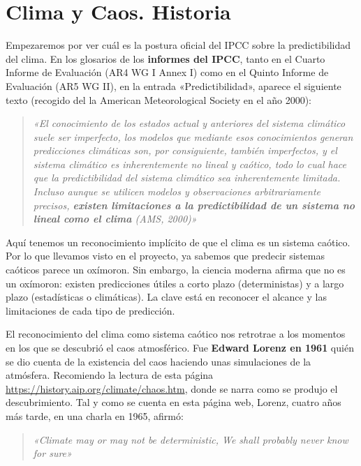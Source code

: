 \documentclass[
  10pt,
  a4paper,
  DIV=11,
  numbers=noendperiod,
  open=any]{scrreprt}
\numberwithin{equation}{chapter}
\numberwithin{equation}{section}
\renewcommand{\[}{\begin{equation}}
\renewcommand{\]}{\end{equation}}
\begin{document}
\section{Clima y Caos. Historia}\label{clima-y-caos.-historia}

Empezaremos por ver cuál es la postura oficial del IPCC sobre la
predictibilidad del clima. En los glosarios de los \textbf{informes del
IPCC}, tanto en el Cuarto Informe de Evaluación (AR4 WG I Annex I) como
en el Quinto Informe de Evaluación (AR5 WG II), en la entrada
«Predictibilidad», aparece el siguiente texto (recogido del la American
Meteorological Society en el año 2000):

\begin{quote}
\itshape
«El conocimiento de los estados actual y anteriores del sistema
climático suele ser imperfecto, los modelos que mediante esos
conocimientos generan predicciones climáticas son, por consiguiente,
también imperfectos, y el sistema climático es inherentemente no lineal
y caótico, todo lo cual hace que la predictibilidad del sistema
climático sea inherentemente limitada. Incluso aunque se utilicen
modelos y observaciones arbitrariamente precisos, \textbf{existen
limitaciones a la predictibilidad de un sistema no lineal como el clima}
(AMS, 2000)»
\end{quote}

Aquí tenemos un reconocimiento implícito de que el clima es un sistema
caótico. Por lo que llevamos visto en el proyecto, ya sabemos que
predecir sistemas caóticos parece un oxímoron. Sin embargo, la ciencia
moderna afirma que no es un oxímoron: existen predicciones útiles a
corto plazo (deterministas) y a largo plazo (estadísticas o climáticas).
La clave está en reconocer el alcance y las limitaciones de cada tipo de
predicción.

El reconocimiento del clima como sistema caótico nos retrotrae a los
momentos en los que se descubrió el caos atmosférico. Fue \textbf{Edward
Lorenz en 1961} quién se dio cuenta de la existencia del caos haciendo
unas simulaciones de la atmósfera. Recomiendo la lectura de esta página
\url{https://history.aip.org/climate/chaos.htm}, donde se narra
como se produjo el descubrimiento. Tal y como se cuenta en esta página web,
Lorenz, cuatro años más tarde, en una charla en 1965, afirmó:

\begin{quote}
\itshape
«Climate may or may not be deterministic, We shall probably never
know for sure»
\end{quote}
\end{document}
